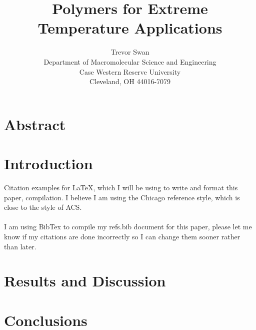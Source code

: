 \documentclass[12pt]{article}
\title{Polymers for Extreme Temperature Applications}
\author{Trevor Swan \\
Department of Macromolecular Science and Engineering \\ 
Case Western Reserve University \\
Cleveland, OH 44016-7079}
\date{}
\begin{document}
\maketitle

\section{Abstract}
	\lipsum[1]
\section{Introduction}
	Citation examples for LaTeX, which I will be using to write and format this paper, compilation. I believe I am  using the Chicago reference style, which is close to the style of ACS. \\
	\indent
	\cite{Batra2020}
	\cite{Bashandeh2021}
	\cite{Dodiok2014}
	\cite{Rioboo2010}
	\cite{LiTong2022} \\
	I am using BibTex to compile my refs.bib document for this paper, please let me know if my citations are done incorrectly so I can change them sooner rather than later.
\section{Results and Discussion}
	\lipsum[1]
\section{Conclusions}
	\lipsum[1] 



\end{document}
